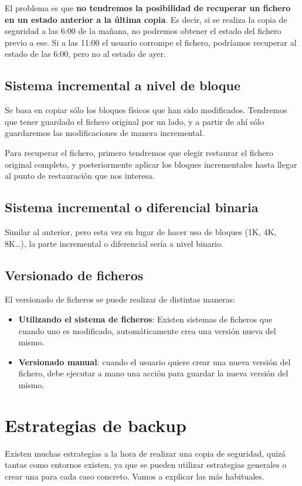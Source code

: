 El problema es que \textbf{no tendremos la posibilidad de recuperar un fichero en un estado anterior a la última copia}. Es decir, si se realiza la copia de seguridad a las 6:00 de la mañana, no podremos obtener el estado del fichero previo a ese. Si a las 11:00 el usuario corrompe el fichero, podríamos recuperar al estado de las 6:00, pero no al estado de ayer.

\subsection{Sistema incremental a nivel de bloque}
Se basa en copiar sólo los bloques físicos que han sido modificados. Tendremos que tener guardado el fichero original por un lado, y a partir de ahí sólo guardaremos las modificaciones de manera incremental.

Para recuperar el fichero, primero tendremos que elegir restaurar el fichero original completo, y posteriormente aplicar los bloques incrementales hasta llegar al punto de restauración que nos interesa.

\subsection{Sistema incremental o diferencial binaria}
Similar al anterior, pero esta vez en lugar de hacer uso de bloques (1K, 4K, 8K…), la parte incremental o diferencial sería a nivel binario.

\subsection{Versionado de ficheros}
El versionado de ficheros se puede realizar de distintas maneras:

\begin{itemize}
    \item \textbf{Utilizando el sistema de ficheros}: Existen sistemas de ficheros que cuando uno es modificado, automáticamente crea una versión nueva del mismo.
    \item \textbf{Versionado manual}: cuando el usuario quiere crear una nueva versión del fichero, debe ejecutar a mano una acción para guardar la nueva versión del mismo.
\end{itemize}

\section{Estrategias de backup}
Existen muchas estrategias a la hora de realizar una copia de seguridad, quizá tantas como entornos existen, ya que se pueden utilizar estrategias generales o crear una para cada caso concreto. Vamos a explicar las más habituales.

